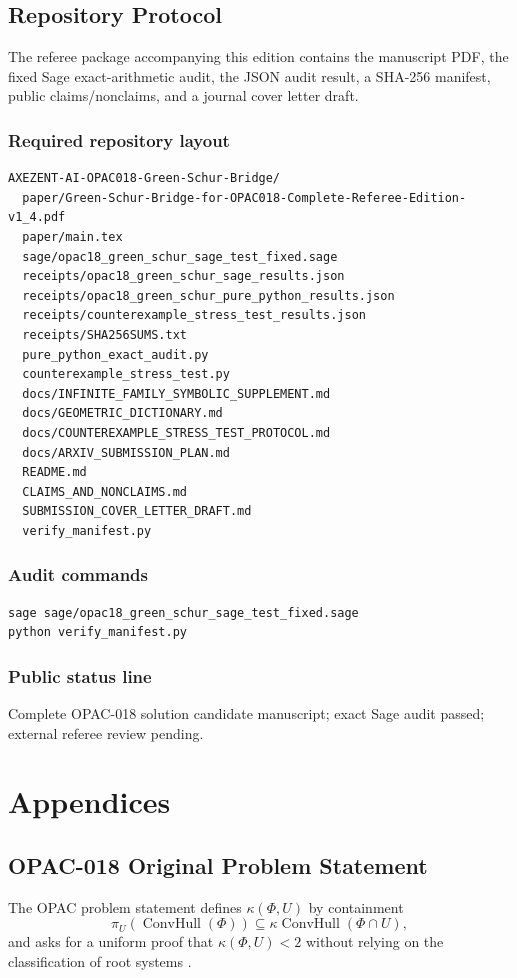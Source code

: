 \documentclass[11pt]{book}
\theoremstyle{definition}
\newcommand{\Conv}{\operatorname{ConvHull}}
\begin{document}
\chapter{Repository Protocol}
The referee package accompanying this edition contains the manuscript PDF, the fixed Sage exact-arithmetic audit, the JSON audit result, a SHA-256 manifest, public claims/nonclaims, and a journal cover letter draft.

\section*{Required repository layout}
\begin{lstlisting}[style=sage]
AXEZENT-AI-OPAC018-Green-Schur-Bridge/
  paper/Green-Schur-Bridge-for-OPAC018-Complete-Referee-Edition-v1_4.pdf
  paper/main.tex
  sage/opac18_green_schur_sage_test_fixed.sage
  receipts/opac18_green_schur_sage_results.json
  receipts/opac18_green_schur_pure_python_results.json
  receipts/counterexample_stress_test_results.json
  receipts/SHA256SUMS.txt
  pure_python_exact_audit.py
  counterexample_stress_test.py
  docs/INFINITE_FAMILY_SYMBOLIC_SUPPLEMENT.md
  docs/GEOMETRIC_DICTIONARY.md
  docs/COUNTEREXAMPLE_STRESS_TEST_PROTOCOL.md
  docs/ARXIV_SUBMISSION_PLAN.md
  README.md
  CLAIMS_AND_NONCLAIMS.md
  SUBMISSION_COVER_LETTER_DRAFT.md
  verify_manifest.py
\end{lstlisting}

\section*{Audit commands}
\begin{lstlisting}[style=sage]
sage sage/opac18_green_schur_sage_test_fixed.sage
python verify_manifest.py
\end{lstlisting}

\section*{Public status line}
Complete OPAC-018 solution candidate manuscript; exact Sage audit passed; external referee review pending.

\appendix
\part{Appendices}

\chapter{OPAC-018 Original Problem Statement}
The OPAC problem statement defines $\kappa(\Phi,U)$ by containment
\[
 \pi_U(\Conv(\Phi))\subseteq \kappa\Conv(\Phi\cap U),
\]
and asks for a uniform proof that $\kappa(\Phi,U)<2$ without relying on the classification of root systems \cite{opac018}.
\end{document}
